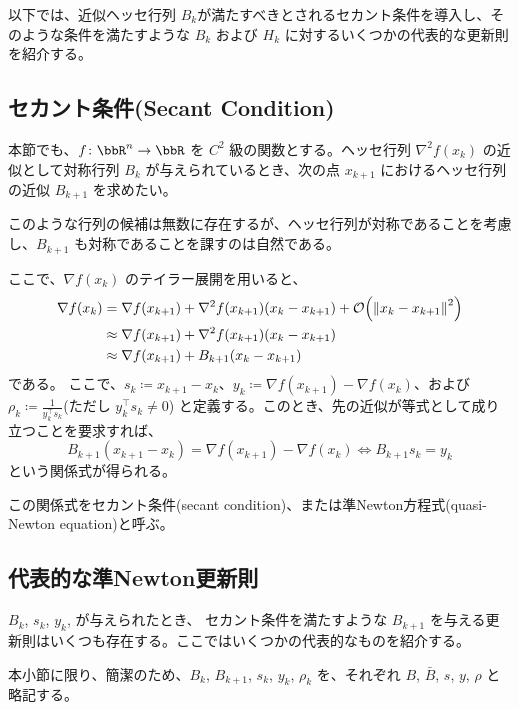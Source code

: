 \documentclass[a4paper, 10pt, dvipdfmx,draft]{article}
\begin{document}
以下では、近似ヘッセ行列 $B_k$が満たすべきとされるセカント条件を導入し、そのような条件を満たすような $B_k$ および $H_k$ に対するいくつかの代表的な更新則を紹介する。

\subsection{セカント条件(Secant Condition) }

本節でも、$f\colon \bbR^n \to \bbR$ を $C^2$ 級の関数とする。ヘッセ行列 $\nabla^2 f(x_k)$ の近似として対称行列 $B_k$ が与えられているとき、次の点 $x_{k+1}$ におけるヘッセ行列の近似 $B_{k+1}$ を求めたい。

このような行列の候補は無数に存在するが、ヘッセ行列が対称であることを考慮し、$B_{k+1}$ も対称であることを課すのは自然である。

ここで、$\nabla f(x_k)$ のテイラー展開を用いると、
\begin{align*}
    \nabla f(x_k) & = \nabla f(x_{k+1}) + \nabla^2 f(x_{k+1})(x_k - x_{k+1}) + \order{\norm{x_k - x_{k+1}}^2} \\
                  & \approx \nabla f(x_{k+1}) + \nabla^2 f(x_{k+1})(x_k - x_{k+1})                            \\
                  & \approx \nabla f(x_{k+1}) + B_{k+1}(x_k - x_{k+1})
\end{align*}
である。
ここで、$s_k \coloneqq x_{k+1} - x_k$、$y_k \coloneqq \nabla f(x_{k+1}) - \nabla f(x_k)$、および $\rho_k \coloneqq \frac{1}{y_k^\top s_k}$(ただし $y_k^\top s_k \neq 0$) と定義する。このとき、先の近似が等式として成り立つことを要求すれば、
\begin{equation*}
    B_{k+1}(x_{k+1} - x_k) = \nabla f(x_{k+1}) - \nabla f(x_k) \iff B_{k+1}s_k = y_k
\end{equation*}
という関係式が得られる。

この関係式をセカント条件(secant condition)、または準Newton方程式(quasi-Newton equation)と呼ぶ。

\subsection{代表的な準Newton更新則}

$B_k$, $s_k$, $y_k$, が与えられたとき、
セカント条件を満たすような $B_{k+1}$ を与える更新則はいくつも存在する。ここではいくつかの代表的なものを紹介する。

本小節に限り、簡潔のため、$B_k$, $B_{k+1}$, $s_k$, $y_k$, $\rho_k$ を、それぞれ $B$, $\bar{B}$, $s$, $y$, $\rho$ と略記する。
\end{document}
